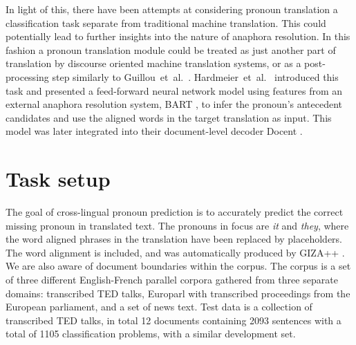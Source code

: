 \documentclass[11pt]{article}
\begin{document}
In light of this, there have been attempts at considering pronoun translation a classification task separate from traditional machine translation.
This could potentially lead to further insights into the nature of anaphora resolution.
In this fashion a pronoun translation module could be treated as just another part of translation by discourse oriented machine translation systems, or as a post-processing step similarly to Guillou~et~al.~.
Hardmeier~et~al.~ introduced this task and presented a feed-forward neural network model using features from an external anaphora resolution system, BART \cite{Broscheit2010Bart}, to infer the pronoun's antecedent candidates and use the aligned words in the target translation as input. This model was later integrated into their document-level decoder Docent \cite[chapter~9]{Hardmeier2013Docent,Hardmeier2014Discoursea}.

\section{Task setup}

The goal of cross-lingual pronoun prediction is to accurately predict the correct missing pronoun in translated text.
The pronouns in focus are \emph{it} and \emph{they}, where the word aligned phrases in the translation have been replaced by placeholders.
The word alignment is included, and was automatically produced by GIZA++ \cite{Och2003Giza}.
We are also aware of document boundaries within the corpus.
The corpus is a set of three different English-French parallel corpora gathered from three separate domains:
transcribed TED talks, Europarl \cite{Koehn2005Europarl} with transcribed proceedings from the European parliament, and a set of news text.
Test data is a collection of transcribed TED talks, in total 12 documents containing 2093 sentences with a total of 1105 classification problems, with a similar development set.
\end{document}
